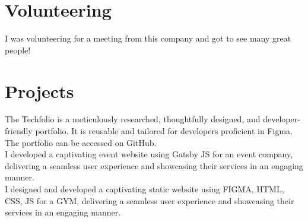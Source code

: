 \documentclass[]{deedy-resume-openfont}
\begin{document}
\begin{minipage}[t]{0.66\textwidth}

\section{Volunteering} 
\begin{tightemize}
\item I was volunteering for a meeting from this company and got to see many great people!
\end{tightemize}

\section{Projects} 
{The Techfolio is a meticulously researched, thoughtfully designed, and developer-friendly portfolio. It is reusable and tailored for developers proficient in Figma. The portfolio can be accessed on GitHub.}
 \\
 \vspace{\topsep}
{I developed a captivating event website using Gatsby JS for an event company, delivering a seamless user experience and showcasing their services in an engaging manner.}
 \\
  \vspace{\topsep}
{I designed and developed a captivating static website using FIGMA, HTML, CSS, JS for a GYM, delivering a seamless user experience and showcasing their services in an engaging manner.}
 \\
\end{minipage} 
\end{document}
